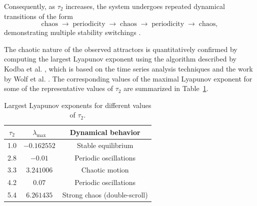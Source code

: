 \documentclass[11pt]{article}
\theoremstyle{remark}
\begin{document}
Consequently, as $\tau_2$ increases, the system undergoes repeated dynamical transitions of the form
\[
\text{chaos}
\;\longrightarrow\;
\text{periodicity}
\;\longrightarrow\;
\text{chaos}
\;\longrightarrow\;
\text{periodicity}
\;\longrightarrow\;
\text{chaos},
\]
demonstrating multiple stability switchings .

	The chaotic nature of the observed attractors is quantitatively confirmed by computing the largest Lyapunov exponent using the algorithm described by Kodba et al. \cite{kodba2005detecting}, which is based on the time series analysis techniques and the work by Wolf et al. \cite{wolf1985determining}. The corresponding values of the maximal Lyapunov exponent for some of the representative values of $\tau_2$ are summarized in Table~\ref{tab:lyap}.

\begin{table}[h!]
	\centering
	\caption{Largest Lyapunov exponents for different values of $\tau_2$.}
	\label{tab:lyap}
	\begin{tabular}{c c c}
		\hline
		$\tau_2$ & $\lambda_{\max}$ & Dynamical behavior \\
		\hline
		1.0 & $-0.162552$ & Stable equilibrium \\
		2.8 & $-0.01$ & Periodic oscillations \\
		3.3 & $3.241006$  & Chaotic motion \\
       	4.2 & $0.07$ & Periodic oscillations\\
		5.4 & $6.261435$  & Strong chaos (double-scroll) \\
		\hline
	\end{tabular}
\end{table}
\end{document}
